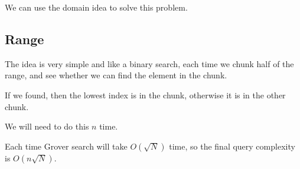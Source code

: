 \documentclass{article}
\theoremstyle{definition}
\begin{document}
We can use the domain idea to solve this problem.

\subsection{Range}

The idea is very simple and like a binary search, each time we chunk half of the range,
and see whether we can find the element in the chunk.

If we found, then the lowest index is in the chunk, otherwise it is in the other chunk.

We will need to do this $n$ time.

Each time Grover search will take $O(\sqrt{N})$ time,
so the final query complexity is $O(n \sqrt{N})$.
\end{document}
